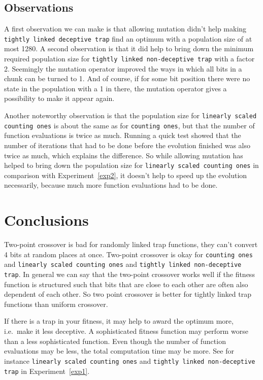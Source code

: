 \documentclass[12pt]{article}
\theoremstyle{definition}
\newcommand{\co}{\texttt{counting ones}}
\newcommand{\lsco}{\texttt{linearly scaled counting ones}}
\newcommand{\tdt}{\texttt{tightly linked deceptive trap}}
\newcommand{\tnt}{\texttt{tightly linked non-deceptive trap}}
\begin{document}
\subsection*{Observations}
A first observation we can make is that allowing mutation didn't help making \tdt{} find
an optimum with a population size of at most 1280.
A second observation is that it did help to bring down the minimum required population size
for \tnt{} with a factor 2.
Seemingly the mutation operator improved the ways in which all bits in a chunk can be turned to 1.
And of course, if for some bit position there were no state in the population with a 1 in there,
the mutation operator gives a possibility to make it appear again.

Another noteworthy observation is that the population size for \lsco{} is about the same
as for \co{}, but that the number of function evaluations is twice as much.
Running a quick test showed that the number of iterations that had to be done before the
evolution finished was also twice as much, which explains the difference.
So while allowing mutation has helped to bring down the population size for \lsco{}
in comparison with Experiment~\ref{exp2},
it doesn't help to speed up the evolution necessarily, because much more
function evaluations had to be done.


\section{Conclusions}

Two-point crossover is bad for randomly linked trap functions, they can't convert 4 bits at
random places at once.
Two-point crossover is okay for \co{} and \lsco{} and \tnt{}.
In general we can say that the two-point crossover works well if the fitness function is
structured such that bits that are close to each other are often also dependent of each other.
So two point crossover is better for tightly linked trap functions than uniform crossover.

If there is a trap in your fitness, it may help to award the optimum more,
i.e.\ make it less deceptive.
A sophisticated fitness function may perform worse than a less sophisticated function.
Even though the number of function evaluations may be less, the total computation time
may be more. See for instance \lsco{} and \tnt{} in Experiment~\ref{exp1}.
\end{document}
